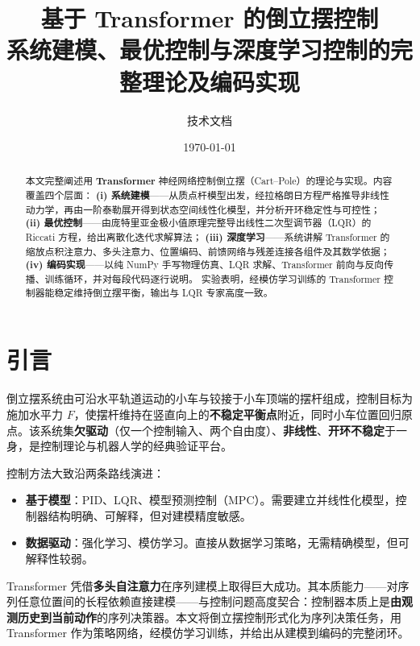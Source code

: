 \documentclass[11pt,a4paper]{article}
\title{\textbf{基于 Transformer 的倒立摆控制}\\[0.5em]
\large 系统建模、最优控制与深度学习控制的完整理论及编码实现}
\author{技术文档}
\date{\today}
\begin{document}
\maketitle

\begin{abstract}
本文完整阐述用 \textbf{Transformer} 神经网络控制倒立摆（Cart--Pole）的理论与实现。内容覆盖四个层面：
\textbf{(i) 系统建模}——从质点杆模型出发，经拉格朗日方程严格推导非线性动力学，再由一阶泰勒展开得到状态空间线性化模型，并分析开环稳定性与可控性；
\textbf{(ii) 最优控制}——由庞特里亚金极小值原理完整导出线性二次型调节器（LQR）的 Riccati 方程，给出离散化迭代求解算法；
\textbf{(iii) 深度学习}——系统讲解 Transformer 的缩放点积注意力、多头注意力、位置编码、前馈网络与残差连接各组件及其数学依据；
\textbf{(iv) 编码实现}——以纯 NumPy 手写物理仿真、LQR 求解、Transformer 前向与反向传播、训练循环，并对每段代码逐行说明。
实验表明，经模仿学习训练的 Transformer 控制器能稳定维持倒立摆平衡，输出与 LQR 专家高度一致。
\end{abstract}

\tableofcontents
\newpage

\section{引言}

倒立摆系统由可沿水平轨道运动的小车与铰接于小车顶端的摆杆组成，控制目标为施加水平力 $F$，使摆杆维持在竖直向上的\textbf{不稳定平衡点}附近，同时小车位置回归原点。该系统集\textbf{欠驱动}（仅一个控制输入、两个自由度）、\textbf{非线性}、\textbf{开环不稳定}于一身，是控制理论与机器人学的经典验证平台。

控制方法大致沿两条路线演进：

\begin{itemize}
    \item \textbf{基于模型}：PID、LQR、模型预测控制（MPC）。需要建立并线性化模型，控制器结构明确、可解释，但对建模精度敏感。
    \item \textbf{数据驱动}：强化学习、模仿学习。直接从数据学习策略，无需精确模型，但可解释性较弱。
\end{itemize}

Transformer \cite{vaswani2017attention} 凭借\textbf{多头自注意力}在序列建模上取得巨大成功。其本质能力——对序列任意位置间的长程依赖直接建模——与控制问题高度契合：控制器本质上是\textbf{由观测历史到当前动作}的序列决策器。本文将倒立摆控制形式化为序列决策任务，用 Transformer 作为策略网络，经模仿学习训练，并给出从建模到编码的完整闭环。
\end{document}
